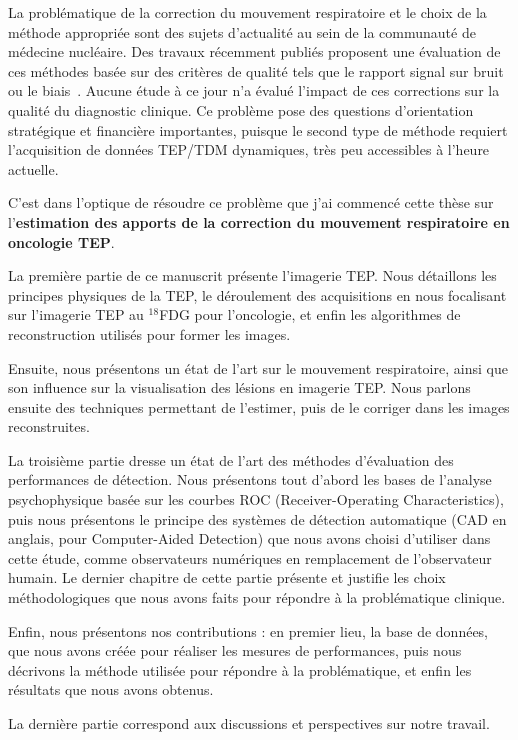 La problématique de la correction du mouvement respiratoire et le choix de la méthode appropriée sont des sujets d’actualité au sein de la communauté de médecine nucléaire. Des travaux récemment publiés proposent une évaluation de ces méthodes basée sur des critères de qualité tels que le rapport signal sur bruit ou le biais~\cite{visvikis2004evaluation}. Aucune étude à ce jour n’a évalué l’impact de ces corrections sur la qualité du diagnostic clinique. Ce problème pose des questions d’orientation stratégique et financière importantes, puisque le second type de méthode requiert l’acquisition de données TEP/TDM dynamiques, très peu accessibles à l’heure actuelle.

C'est dans l'optique de résoudre ce problème que j'ai commencé cette thèse sur l'\textbf{estimation des apports de la correction du mouvement respiratoire en oncologie TEP}.


La première partie de ce manuscrit présente l'imagerie TEP. Nous détaillons les principes physiques de la TEP, le déroulement des acquisitions en nous focalisant sur l'imagerie TEP au $^{18}$FDG pour l'oncologie, et enfin les algorithmes de reconstruction utilisés pour former les images.

Ensuite, nous présentons un état de l'art sur le mouvement respiratoire, ainsi que son influence sur la visualisation des lésions en imagerie TEP. Nous parlons ensuite des techniques permettant de l'estimer, puis de le corriger dans les images reconstruites.

La troisième partie dresse un état de l'art des méthodes d'évaluation des performances de détection. Nous présentons tout d'abord les bases de l'analyse psychophysique basée sur les courbes ROC (Receiver-Operating Characteristics), puis nous présentons le principe des systèmes de détection automatique (CAD en anglais, pour Computer-Aided Detection) que nous avons choisi d'utiliser dans cette étude, comme observateurs numériques en remplacement de l'observateur humain. Le dernier chapitre de cette partie présente et justifie les choix méthodologiques que nous avons faits pour répondre à la problématique clinique.

Enfin, nous présentons nos contributions : en premier lieu, la base de données, que nous avons créée pour réaliser les mesures de performances, puis nous décrivons la méthode utilisée pour répondre à la problématique, et enfin les résultats que nous avons obtenus.

La dernière partie correspond aux discussions et perspectives sur notre travail.